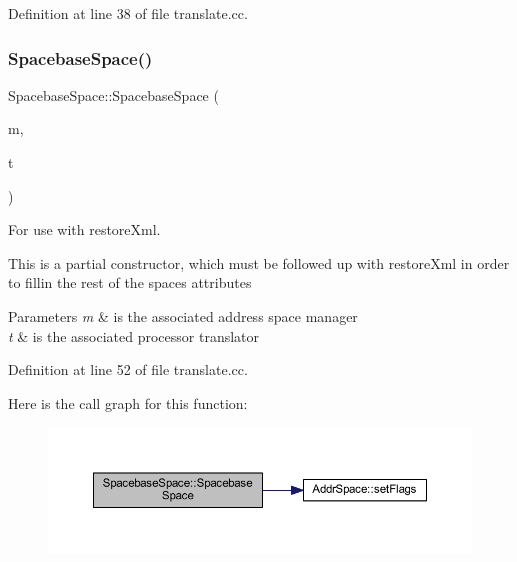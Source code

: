 Definition at line 38 of file translate.\+cc.

\mbox{\label{class_spacebase_space_a8754e42b3db0e9b5df5e8003b881d15b}} 
\subsubsection{\texorpdfstring{SpacebaseSpace()}{SpacebaseSpace()}\hspace{0.1cm}{\footnotesize\ttfamily [2/2]}}
{\footnotesize\ttfamily Spacebase\+Space\+::\+Spacebase\+Space (\begin{DoxyParamCaption}\item[{\mbox{\hyperlink{class_addr_space_manager}{Addr\+Space\+Manager}} $\ast$}]{m,  }\item[{const \mbox{\hyperlink{class_translate}{Translate}} $\ast$}]{t }\end{DoxyParamCaption})}



For use with restore\+Xml. 

This is a partial constructor, which must be followed up with restore\+Xml in order to fillin the rest of the spaces attributes 
\begin{DoxyParams}{Parameters}
{\em m} & is the associated address space manager \\
\hline
{\em t} & is the associated processor translator \\
\hline
\end{DoxyParams}


Definition at line 52 of file translate.\+cc.

Here is the call graph for this function\+:
\nopagebreak
\begin{figure}[H]
\begin{center}
\leavevmode
\includegraphics[width=350pt]{class_spacebase_space_a8754e42b3db0e9b5df5e8003b881d15b_cgraph}
\end{center}
\end{figure}


